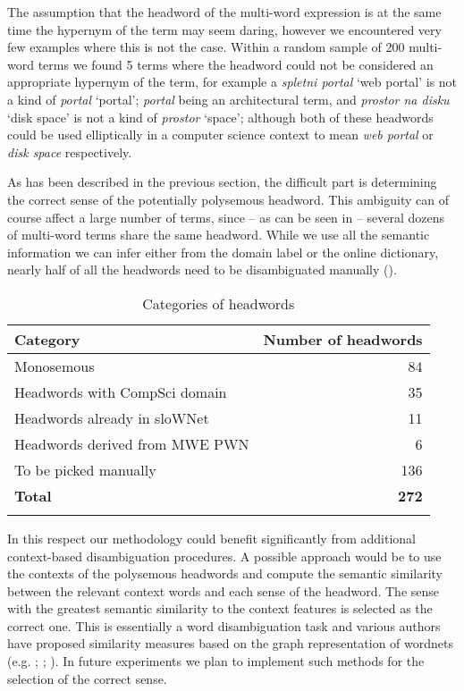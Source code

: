 \documentclass[output=paper]{LSP/langsci}
\begin{document}
The assumption that the headword of the multi-word expression is at the same time the hypernym of the term may seem daring, however we encountered very few examples where this is not the case. Within a random sample of 200 multi-word terms we found 5 terms where the headword could not be considered an appropriate hypernym of the term, for example a \textit{spletni portal} `web portal' is not a kind of \textit{portal} `portal'; \textit{portal} being an architectural term, and \textit{prostor na disku} `disk space' is not a kind of \textit{prostor} `space'; although both of these headwords could be used elliptically in a computer science context to mean \textit{web portal} or \textit{disk space} respectively. 

As has been described in the previous section, the difficult part is determining the correct sense of the potentially polysemous headword. This ambiguity can of course affect a large number of terms, since -- as can be seen in  -- several dozens of multi-word terms share the same headword. While we use all the semantic information we can infer either from the domain label or the online dictionary, nearly half of all the headwords need to be disambiguated manually ().

\begin{table}
\begin{tabular}{lr}
\lsptoprule
\textbf{Category} & \textbf{Number of headwords}\\
\midrule
Monosemous & 84\\
Headwords with CompSci domain & 35\\
Headwords already in sloWNet &  11\\
Headwords derived from MWE PWN & 6\\
To be picked manually & 136\\
\textbf{Total} & \textbf{272}\\
\lspbottomrule
\end{tabular}
\caption{Categories of headwords}
\label{tab:vintar:9}
\end{table}

In this respect our methodology could benefit significantly from additional context-based disambiguation procedures. A possible approach would be to use the contexts of the polysemous headwords and compute the semantic similarity between the relevant context words and each sense of the headword. The sense with the greatest semantic similarity to the context features is selected as the correct one. This is essentially a word disambiguation task and various authors have proposed similarity measures based on the graph representation of wordnets (e.g. \citealt{Leacock1998}; \citealt{Wu1994}; \citealt{AgirreEtAl2009}). In future experiments we plan to implement such methods for the selection of the correct sense.
\end{document}
